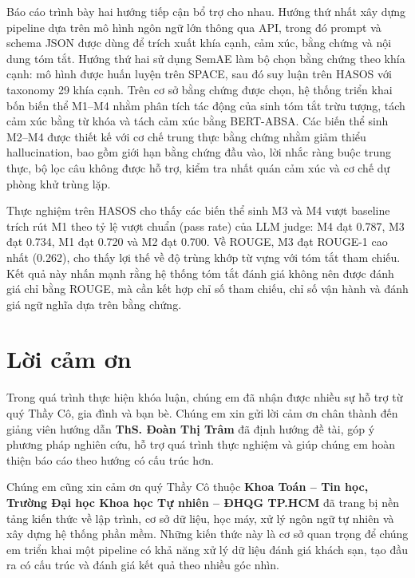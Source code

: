 \documentclass[12pt,a4paper]{report}
\newcommand{\universityname}{Trường Đại học Khoa học Tự nhiên -- ĐHQG TP.HCM}
\newcommand{\facultyname}{Khoa Toán -- Tin học}
\newcommand{\advisorname}{ThS. Đoàn Thị Trâm}
\begin{document}
Báo cáo trình bày hai hướng tiếp cận bổ trợ cho nhau. Hướng thứ nhất xây dựng pipeline dựa trên mô hình ngôn ngữ lớn thông qua API, trong đó prompt và schema JSON được dùng để trích xuất khía cạnh, cảm xúc, bằng chứng và nội dung tóm tắt. Hướng thứ hai sử dụng SemAE làm bộ chọn bằng chứng theo khía cạnh: mô hình được huấn luyện trên SPACE, sau đó suy luận trên HASOS với taxonomy 29 khía cạnh. Trên cơ sở bằng chứng được chọn, hệ thống triển khai bốn biến thể M1--M4 nhằm phân tích tác động của sinh tóm tắt trừu tượng, tách cảm xúc bằng từ khóa và tách cảm xúc bằng BERT-ABSA. Các biến thể sinh M2--M4 được thiết kế với cơ chế trung thực bằng chứng nhằm giảm thiểu hallucination, bao gồm giới hạn bằng chứng đầu vào, lời nhắc ràng buộc trung thực, bộ lọc câu không được hỗ trợ, kiểm tra nhất quán cảm xúc và cơ chế dự phòng khử trùng lặp.

Thực nghiệm trên HASOS cho thấy các biến thể sinh M3 và M4 vượt baseline trích rút M1 theo tỷ lệ vượt chuẩn (pass rate) của LLM judge: M4 đạt \num{0.787}, M3 đạt \num{0.734}, M1 đạt \num{0.720} và M2 đạt \num{0.700}. Về ROUGE, M3 đạt ROUGE-1 cao nhất (\num{0.262}), cho thấy lợi thế về độ trùng khớp từ vựng với tóm tắt tham chiếu. Kết quả này nhấn mạnh rằng hệ thống tóm tắt đánh giá không nên được đánh giá chỉ bằng ROUGE, mà cần kết hợp chỉ số tham chiếu, chỉ số vận hành và đánh giá ngữ nghĩa dựa trên bằng chứng.

\clearpage

\tableofcontents
\clearpage
\listoffigures
\clearpage
\listoftables
\clearpage

\chapter*{Lời cảm ơn}

Trong quá trình thực hiện khóa luận, chúng em đã nhận được nhiều sự hỗ trợ từ quý Thầy Cô, gia đình và bạn bè. Chúng em xin gửi lời cảm ơn chân thành đến giảng viên hướng dẫn \textbf{\advisorname} đã định hướng đề tài, góp ý phương pháp nghiên cứu, hỗ trợ quá trình thực nghiệm và giúp chúng em hoàn thiện báo cáo theo hướng có cấu trúc hơn.

Chúng em cũng xin cảm ơn quý Thầy Cô thuộc \textbf{\facultyname, \universityname} đã trang bị nền tảng kiến thức về lập trình, cơ sở dữ liệu, học máy, xử lý ngôn ngữ tự nhiên và xây dựng hệ thống phần mềm. Những kiến thức này là cơ sở quan trọng để chúng em triển khai một pipeline có khả năng xử lý dữ liệu đánh giá khách sạn, tạo đầu ra có cấu trúc và đánh giá kết quả theo nhiều góc nhìn.
\end{document}
